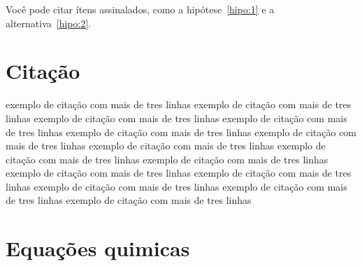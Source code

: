 Você pode citar ítens assinalados, como a hipótese~\ref{hipo:1} e a alternativa~\ref{hipo:2}.

\section{Citação}

\begin{quoting}[rightmargin=0cm,leftmargin=4cm]
\begin{singlespace}
{\footnotesize  
exemplo de citação com mais de tres linhas
exemplo de citação com mais de tres linhas
exemplo de citação com mais de tres linhas
exemplo de citação com mais de tres linhas
exemplo de citação com mais de tres linhas
exemplo de citação com mais de tres linhas
exemplo de citação com mais de tres linhas
exemplo de citação com mais de tres linhas
exemplo de citação com mais de tres linhas
exemplo de citação com mais de tres linhas
exemplo de citação com mais de tres linhas
exemplo de citação com mais de tres linhas
exemplo de citação com mais de tres linhas
exemplo de citação com mais de tres linhas
}
\end{singlespace}
\end{quoting}


\section{Equações quimicas}
 
 \newline


